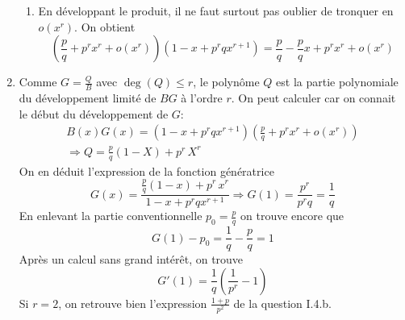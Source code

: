 \begin{enumerate}
\begin{enumerate}
 \item En développant le produit, il ne faut surtout pas oublier de tronquer en $o(x^r)$. On obtient
\begin{displaymath}
 \left( \frac{p}{q} + p^r x^r + o(x^r)\right)\left( 1 - x + p^rq x^{r+1}\right)  
= \frac{p}{q} - \frac{p}{q}x + p^r x^r + o(x^r)
\end{displaymath}
\end{enumerate}

 \item Comme $G=\frac{Q}{B}$ avec $\deg(Q)\leq r$, le polynôme $Q$ est la partie polynomiale du développement limité de $BG$ à l'ordre $r$. On peut calculer car on connait le début du développement de $G$:
\begin{multline*}
 B(x)G(x) = \left( 1 - x +p^rq x^{r+1}\right)\left( \frac{p}{q} +p^r x^r + o(x^r)\right) \\
 \Rightarrow 
 Q = \frac{p}{q} (1-X) + p^r\,X^r
\end{multline*}
On en déduit l'expression de la fonction génératrice
\begin{displaymath}
 G(x) = \frac{\frac{p}{q} (1-x) + p^r\,x^r}{1 - x + p^rq x^{r+1}}
 \Rightarrow G(1) = \frac{p^r}{p^rq}=\frac{1}{q}
\end{displaymath}
En enlevant la partie conventionnelle $p_0 = \frac{p}{q}$ on trouve encore que 
\begin{displaymath}
 G(1) - p_0 = \frac{1}{q} - \frac{p}{q} = 1
\end{displaymath}
Après un calcul sans grand intérêt, on trouve
\begin{displaymath}
 G'(1) = \frac{1}{q}\left( \frac{1}{p^r} -1\right) 
\end{displaymath}
Si $r=2$, on retrouve bien l'expression $\frac{1+p}{p^2}$ de la question I.4.b.
\end{enumerate}
